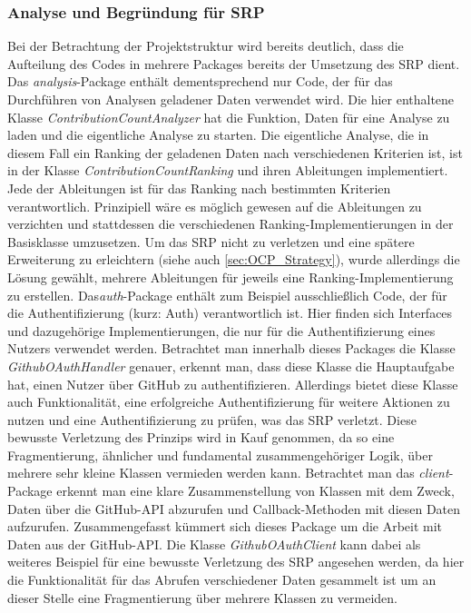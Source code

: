 \subsubsection{Analyse und Begründung für SRP}
\label{sec:Analyse_SRP}
Bei der Betrachtung der Projektstruktur wird bereits deutlich, dass die Aufteilung des Codes in mehrere Packages bereits der Umsetzung des SRP dient.
Das \textit{analysis}-Package enthält dementsprechend nur Code, der für das Durchführen von Analysen geladener Daten verwendet wird.
Die hier enthaltene Klasse \textit{ContributionCountAnalyzer} hat die Funktion, Daten für eine Analyse zu laden und die eigentliche Analyse zu starten.
Die eigentliche Analyse, die in diesem Fall ein Ranking der geladenen Daten nach verschiedenen Kriterien ist, ist in der Klasse \textit{ContributionCountRanking} und ihren Ableitungen implementiert.
Jede der Ableitungen ist für das Ranking nach bestimmten Kriterien verantwortlich.
Prinzipiell wäre es möglich gewesen auf die Ableitungen zu verzichten und stattdessen die verschiedenen Ranking-Implementierungen in der Basisklasse umzusetzen.
Um das SRP nicht zu verletzen und eine spätere Erweiterung zu erleichtern (siehe auch \ref{sec:OCP_Strategy}), wurde allerdings die Lösung gewählt, mehrere Ableitungen für jeweils eine Ranking-Implementierung zu erstellen. 
\newline
Das\textit{auth}-Package enthält zum Beispiel ausschließlich Code, der für die Authentifizierung (kurz: Auth) verantwortlich ist.
Hier finden sich Interfaces und dazugehörige Implementierungen, die nur für die Authentifizierung eines Nutzers verwendet werden.
Betrachtet man innerhalb dieses Packages die Klasse \textit{GithubOAuthHandler} genauer, erkennt man, dass diese Klasse die Hauptaufgabe hat, einen Nutzer über GitHub zu authentifizieren.
Allerdings bietet diese Klasse auch Funktionalität, eine erfolgreiche Authentifizierung für weitere Aktionen zu nutzen und eine Authentifizierung zu prüfen, was das SRP verletzt.
Diese bewusste Verletzung des Prinzips wird in Kauf genommen, da so eine Fragmentierung, ähnlicher und fundamental zusammengehöriger Logik, über mehrere sehr kleine Klassen vermieden werden kann.
\newline
Betrachtet man das \textit{client}-Package erkennt man eine klare Zusammenstellung von Klassen mit dem Zweck, Daten über die GitHub-API abzurufen und Callback-Methoden mit diesen Daten aufzurufen.
Zusammengefasst kümmert sich dieses Package um die Arbeit mit Daten aus der GitHub-API.
Die Klasse \textit{GithubOAuthClient} kann dabei als weiteres Beispiel für eine bewusste Verletzung des SRP angesehen werden, da hier die Funktionalität für das Abrufen verschiedener Daten gesammelt ist um an dieser Stelle eine Fragmentierung über mehrere Klassen zu vermeiden. 
